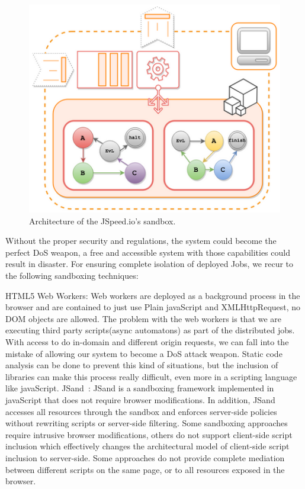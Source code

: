 \documentclass[10pt,reprint]{socc14}
\begin{document}

\begin{figure}[h]	
	\centering
	\includegraphics[scale=0.7]{sandboxDiagram}
	\caption{Architecture of the JSpeed.io’s sandbox.}
	\label{fig:sandboxDiagram}
\end{figure}


Without the proper security and regulations, the system could become the perfect DoS weapon, a free and accessible system with those capabilities could result in disaster. For ensuring complete isolation of deployed Jobs, we recur to the following sandboxing techniques:

HTML5 Web Workers: Web workers are deployed as a background process in the browser and are contained to just use Plain javaScript and XMLHttpRequest, no DOM objects are allowed. The problem with the web workers is that we are executing third party scripts(async automatons) as part of the distributed jobs. With access to do in-domain and different origin requests, we can fall into the mistake of allowing our system to become a DoS attack weapon. Static code analysis can be done to prevent this kind of situations, but the inclusion of libraries can make this process really difficult, even more in a scripting language like javaScript.
JSand~\cite{Agten2012}: JSand is a sandboxing framework implemented in javaScript that does not require browser modifications. In addition, JSand accesses all resources through the sandbox and enforces server-side policies without rewriting scripts or server-side filtering. Some sandboxing approaches require intrusive browser modifications, others do not support client-side script inclusion which effectively changes the architectural model of client-side script inclusion to server-side. Some approaches do not provide complete mediation between different scripts on the same page, or to all resources exposed in the browser.
\end{document}
